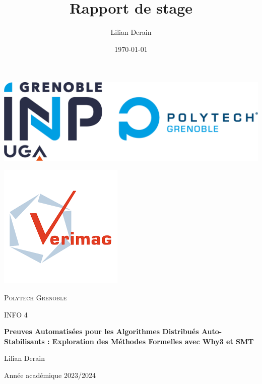 \documentclass[11pt]{article}
\author{Lilian Derain}
\date{\today}
\title{Rapport de stage}
\begin{document}
\begin{LaTeX}
\begin{titlepage}


    \centering
    \begin{minipage}{0.45\textwidth}
        \centering
        \includegraphics[width=\textwidth]{figs/popo.png} 
    \end{minipage}
    \hfill
    \begin{minipage}{0.45\textwidth}
        \centering
        \includegraphics[width=\textwidth]{figs/verimag.png} 
    \end{minipage}
    \par\vspace{1cm}


    {\scshape\LARGE Polytech Grenoble\par}
    \vspace{1cm}
    {\Large INFO 4 \par}
    \vspace{1.5cm}
    {\Large\bfseries Preuves Automatisées pour les Algorithmes Distribués Auto-Stabilisants : Exploration des Méthodes Formelles avec Why3 et SMT \par}
    \vspace{2cm}
    {\Large Lilian Derain\par}
    \vfill
    {\large Année académique 2023/2024\par}
\end{titlepage}
\end{LaTeX}
\end{document}
